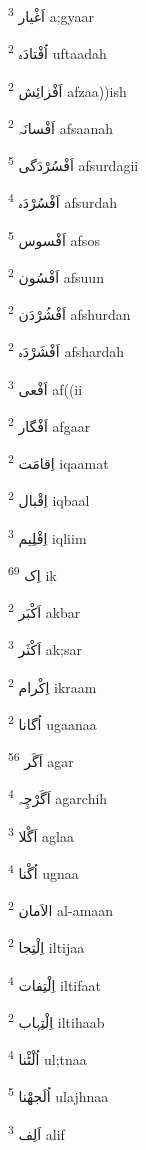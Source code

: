 \documentclass[12pt]{article}
\begin{document}
\begin{RTL}
\begin{multicols}{5}
{\ur اَغْیار}   \textsuperscript{3} a;gyaar

{\ur اُفْتادَہ}   \textsuperscript{2} uftaadah

{\ur اَفْزائِش}   \textsuperscript{2} afzaa))ish

{\ur اَفْسانَہ}   \textsuperscript{2} afsaanah

{\ur اَفْسُرْدَگی}   \textsuperscript{5} afsurdagii

{\ur اَفْسُرْدَہ}   \textsuperscript{4} afsurdah

{\ur اَفْسوس}   \textsuperscript{5} afsos

{\ur اَفْسُون}   \textsuperscript{2} afsuun

{\ur اَفْشُرْدَن}   \textsuperscript{2} afshurdan

{\ur اَفْشَرْدَہ}   \textsuperscript{2} afshardah

{\ur اَفْعی}   \textsuperscript{3} af((ii

{\ur اَفْگار}   \textsuperscript{2} afgaar

{\ur اِقامَت}   \textsuperscript{2} iqaamat

{\ur اِقْبال}   \textsuperscript{2} iqbaal

{\ur اِقْلِیم}   \textsuperscript{3} iqliim

{\ur اِک}   \textsuperscript{69} ik

{\ur اَکْبَر}   \textsuperscript{2} akbar

{\ur اَکْثَر}   \textsuperscript{3} ak;sar

{\ur اِکْرام}   \textsuperscript{2} ikraam

{\ur اُگانا}   \textsuperscript{2} ugaanaa

{\ur اَگَر}   \textsuperscript{56} agar

{\ur اَگَرْچِہ}   \textsuperscript{4} agarchih

{\ur اَگْلا}   \textsuperscript{3} aglaa

{\ur اُگْنا}   \textsuperscript{4} ugnaa

{\ur الاَمان}   \textsuperscript{2} al-amaan

{\ur اِلْتِجا}   \textsuperscript{2} iltijaa

{\ur اِلْتِفات}   \textsuperscript{4} iltifaat

{\ur اِلْتِہاب}   \textsuperscript{2} iltihaab

{\ur اُلْٹْنا}   \textsuperscript{4} ul;tnaa

{\ur اُلَجھْنا}   \textsuperscript{5} ulajhnaa

{\ur اَلِف}   \textsuperscript{3} alif


\end{multicols}
\end{RTL}
\end{document}
